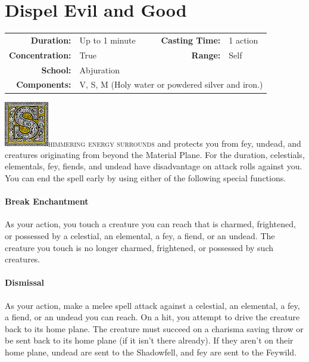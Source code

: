 \documentclass[12pt,showtrims]{memoir}
\begin{document}
\newpage
\section*{Dispel Evil and Good}

{
\small\centering\vspace{-6pt}
\begin{tabular}{rlrl}
\toprule

\textbf{Duration:} & Up to 1 minute &
\textbf{Casting Time:} & 1 action \\
\textbf{Concentration:} & True &
\textbf{Range:} & Self \\
\textbf{School:} & Abjuration \\
\textbf{Components:} & \multicolumn{3}{p{0.7\textwidth}}{V, S, M (Holy water or powdered silver and iron.)}\\

\bottomrule
\end{tabular}
}

\vspace{1\baselineskip}\noindent
\lettrine[lines=4]{\includegraphics[height=56pt]{initials/S.png}}{himmering energy surrounds} and protects you from fey, undead, and creatures originating from beyond the Material Plane. For the duration, celestials, elementals, fey, fiends, and undead have disadvantage on attack rolls against you. You can end the spell early by using either of the following special functions. \paragraph{Break Enchantment} As your action, you touch a creature you can reach that is charmed, frightened, or possessed by a celestial, an elemental, a fey, a fiend, or an undead. The creature you touch is no longer charmed, frightened, or possessed by such creatures. \paragraph{Dismissal} As your action, make a melee spell attack against a celestial, an elemental, a fey, a fiend, or an undead you can reach. On a hit, you attempt to drive the creature back to its home plane. The creature must succeed on a charisma saving throw or be sent back to its home plane (if it isn't there already). If they aren't on their home plane, undead are sent to the Shadowfell, and fey are sent to the Feywild.
\newpage
\end{document}
